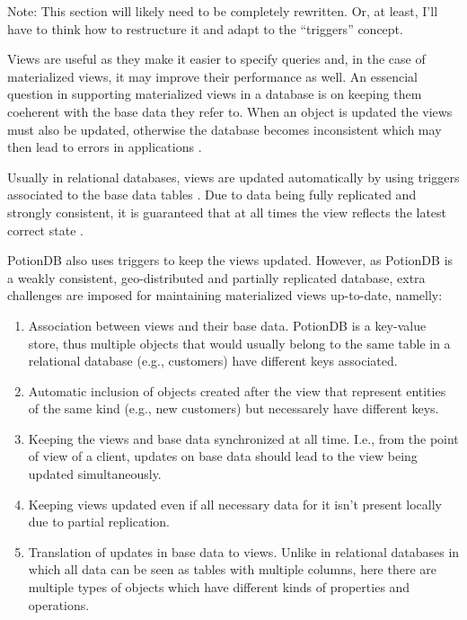 \documentclass{vldb}
\newcommand{\grumbler}[2]{{\color{red}{\bf #1:} #2}}
\newcommand{\andre}[1]{\grumbler{andre}{#1}}
\begin{document}
\andre{Note: This section will likely need to be completely rewritten. Or, at least, I'll have to think how to restructure it and adapt to the ``triggers'' concept.}

Views are useful as they make it easier to specify queries and, in the case of materialized views, it may improve their performance as well.
An essencial question in supporting materialized views in a database is on keeping them coeherent with the base data they refer to.
When an object is updated the views must also be updated, otherwise the database becomes inconsistent which may then lead to errors in applications \cite{???}.

Usually in relational databases, views are updated automatically by using triggers associated to the base data tables \cite{???}.
Due to data being fully replicated and strongly consistent, it is guaranteed that at all times the view reflects the latest correct state \cite{???}.

PotionDB also uses triggers to keep the views updated. However, as PotionDB is a weakly consistent, geo-distributed and partially replicated database, extra challenges are imposed for maintaining materialized views up-to-date, namelly:
\begin{enumerate}
	\item Association between views and their base data. 
	PotionDB is a key-value store, thus multiple objects that would usually belong to the same table in a relational database (e.g., customers) have different keys associated.
	\item Automatic inclusion of objects created after the view that represent entities of the same kind (e.g., new customers) but necessarely have different keys.
	\item Keeping the views and base data synchronized at all time.
	I.e., from the point of view of a client, updates on base data should lead to the view being updated simultaneously.
	\item Keeping views updated even if all necessary data for it isn't present locally due to partial replication.
	\item Translation of updates in base data to views. 
	Unlike in relational databases in which all data can be seen as tables with multiple columns, here there are multiple types of objects which have different kinds of properties and operations.
\end{enumerate}
\end{document}
